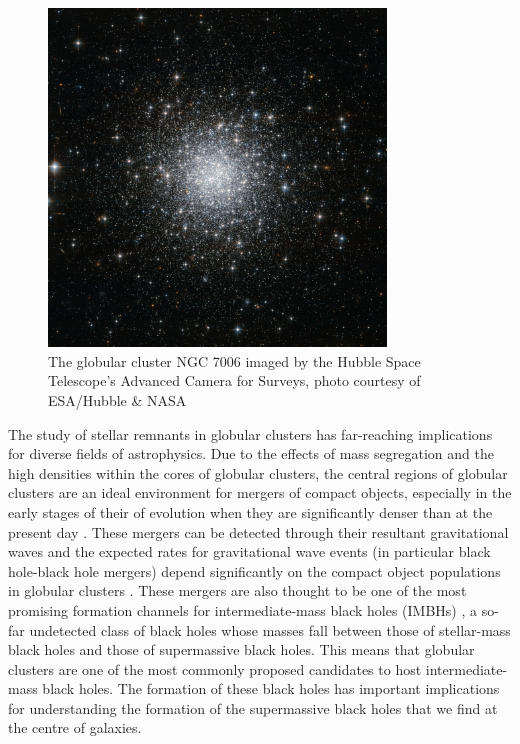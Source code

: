 \begin{figure}
	\centering
	\includegraphics[width=0.8\textwidth]{figures/c42.jpg}
	\caption{The globular cluster NGC 7006 imaged by the Hubble Space Telescope's Advanced
		Camera for Surveys, photo courtesy of ESA/Hubble \& NASA}
	\label{fig:1/ngc7006}
\end{figure}



The study of stellar remnants in globular clusters has far-reaching implications for diverse fields
of astrophysics.  Due to the effects of mass segregation and the high densities within the cores of
globular clusters, the central regions of globular clusters are an ideal environment for mergers of
compact objects, especially in the early stages of their of evolution when they are significantly
denser than at the present day \citep[e.g.][]{PortegiesZwart2004,Rodriguez2021}. These mergers can
be detected through their resultant gravitational waves and the expected rates for gravitational
wave events (in particular black hole-black hole mergers) depend significantly on the compact object
populations in globular clusters \citep[e.g][]{Weatherford2021}. These mergers are also thought to
be one of the most promising formation channels for intermediate-mass black holes (IMBHs)
\citep[e.g.][]{Giersz2015}, a so-far undetected class of black holes whose masses fall between those
of stellar-mass black holes and those of supermassive black holes. This means that globular clusters
are one of the most commonly proposed candidates to host intermediate-mass black holes. The
formation of these black holes has important implications for understanding the formation of the
supermassive black holes that we find at the centre of galaxies.


